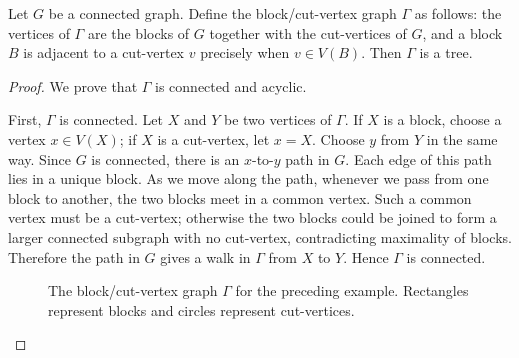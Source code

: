 \begin{proposition}
    Let \(G\) be a connected graph.  Define the block/cut-vertex graph \(\Gamma\) as follows: the vertices of \(\Gamma\) are the blocks of \(G\) together with the cut-vertices of \(G\), and a block \(B\) is adjacent to a cut-vertex \(v\) precisely when \(v \in V(B)\).  Then \(\Gamma\) is a tree.
\end{proposition}

\begin{proof}
    We prove that \(\Gamma\) is connected and acyclic.

    First, \(\Gamma\) is connected.  Let \(X\) and \(Y\) be two vertices of \(\Gamma\).  If \(X\) is a block, choose a vertex \(x \in V(X)\); if \(X\) is a cut-vertex, let \(x=X\).  Choose \(y\) from \(Y\) in the same way.  Since \(G\) is connected, there is an \(x\)-to-\(y\) path in \(G\).  Each edge of this path lies in a unique block.  As we move along the path, whenever we pass from one block to another, the two blocks meet in a common vertex.  Such a common vertex must be a cut-vertex; otherwise the two blocks could be joined to form a larger connected subgraph with no cut-vertex, contradicting maximality of blocks.  Therefore the path in \(G\) gives a walk in \(\Gamma\) from \(X\) to \(Y\).  Hence \(\Gamma\) is connected.

    \begin{figure}[H]
    \centering
    \caption{The block/cut-vertex graph \(\Gamma\) for the preceding example.  Rectangles represent blocks and circles represent cut-vertices.}
    \end{figure}


\end{proof}
